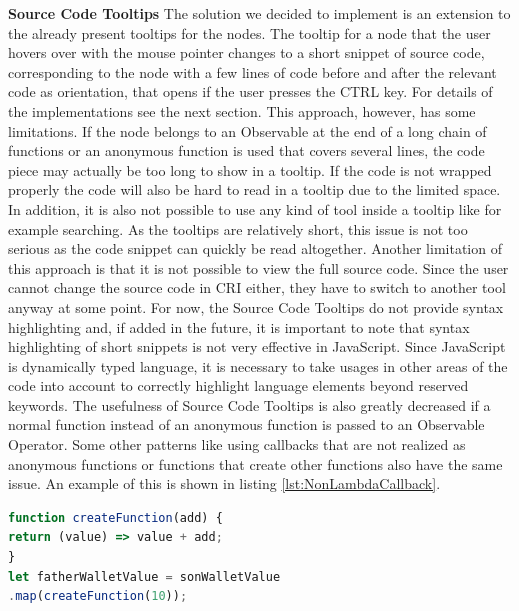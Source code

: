 \textbf{Source Code Tooltips}
The solution we decided to implement is an extension to the already present tooltips for the nodes. The tooltip for a node that the user hovers over with the mouse pointer changes to a short snippet of source code, corresponding to the node with a few lines of code before and after the relevant code as orientation, that opens if the user presses the CTRL key. For details of the implementations see the next section. This approach, however, has some limitations. If the node belongs to an Observable at the end of a long chain of functions or an anonymous function is used that covers several lines, the code piece may actually be too long to show in a tooltip. If the code is not wrapped properly the code will also be hard to read in a tooltip due to the limited space. In addition, it is also not possible to use any kind of tool inside a tooltip like for example searching. As the tooltips are relatively short, this issue is not too serious as the code snippet can quickly be read altogether. Another limitation of this approach is that it is not possible to view the full source code. Since the user cannot change the source code in CRI either, they have to switch to another tool anyway at some point. For now, the Source Code Tooltips do not provide syntax highlighting and, if added in the future,  it is important to note that syntax highlighting of short snippets is not very effective in JavaScript. Since JavaScript is dynamically typed language, it is necessary to take usages in other areas of the code into account to correctly highlight language elements beyond reserved keywords. The usefulness of Source Code Tooltips is also greatly decreased if a normal function instead of an anonymous function is passed to an Observable Operator. Some other patterns like using callbacks that are not realized as anonymous functions or functions that create other functions also have the same issue. An example of this is shown in listing \ref{lst:NonLambdaCallback}.

\begin{lstlisting}[language=JavaScript, caption={Example of using a creation function in RxJS.},label={lst:NonLambdaCallback}]
function createFunction(add) {
return (value) => value + add;
}
let fatherWalletValue = sonWalletValue
.map(createFunction(10));
\end{lstlisting}

